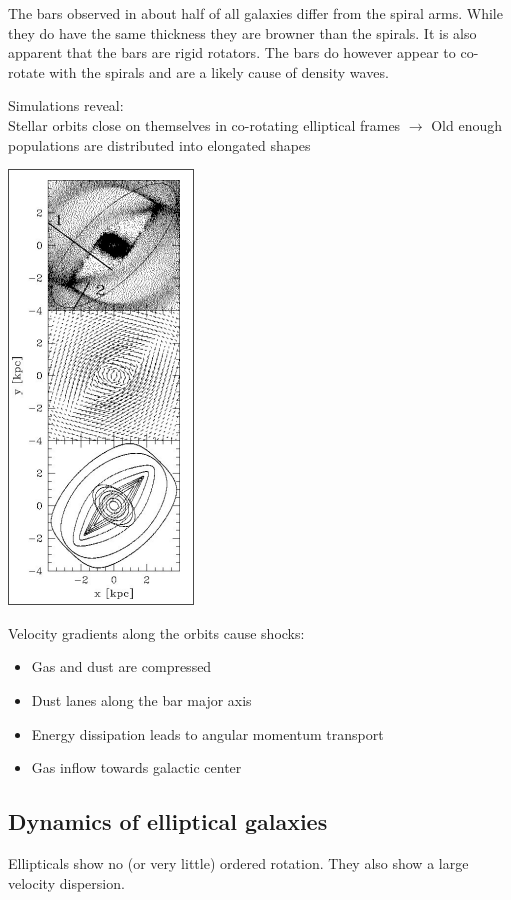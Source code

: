 \documentclass[11pt,a4paper]{article}
\begin{document}
The bars observed in about half of all galaxies differ from the spiral arms. 
While they do have the same thickness they are browner than the spirals.
It is also apparent that the bars are rigid rotators. 
The bars do however appear to co-rotate with the spirals and are a likely cause of density waves. 

Simulations reveal:  \\
Stellar orbits close on themselves in co-rotating elliptical frames $\rightarrow$ Old enough populations are
distributed into elongated shapes
\begin{center}
    \includegraphics[width=0.3\linewidth]{screenshot_2024-01-26-141350.png}
\end{center}
Velocity gradients along the orbits cause shocks: 
\begin{itemize}
    \item Gas and dust are compressed
    \item Dust lanes along the bar major axis
    \item Energy dissipation leads to angular momentum transport
    \item Gas inflow towards galactic center
\end{itemize}
\subsection{Dynamics of elliptical galaxies}
Ellipticals show no (or
very little) ordered
rotation.
They also show a large velocity dispersion. 
\end{document}
